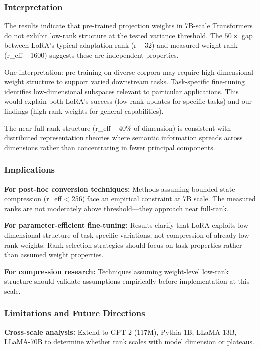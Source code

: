 
\subsubsection{Interpretation}

The results indicate that pre-trained projection weights in 7B-scale Transformers do not exhibit low-rank structure at the tested variance threshold. The $50\times$ gap between LoRA's typical adaptation rank (r ~ 32) and measured weight rank (r\_eff ~ 1600) suggests these are independent properties.

One interpretation: pre-training on diverse corpora may require high-dimensional weight structure to support varied downstream tasks. Task-specific fine-tuning identifies low-dimensional subspaces relevant to particular applications. This would explain both LoRA's success (low-rank updates for specific tasks) and our findings (high-rank weights for general capabilities).

The near full-rank structure (r\_eff ~ 40\% of dimension) is consistent with distributed representation theories where semantic information spreads across dimensions rather than concentrating in fewer principal components.

\subsubsection{Implications}

\textbf{For post-hoc conversion techniques:} Methods assuming bounded-state compression (r\_eff < 256) face an empirical constraint at 7B scale. The measured ranks are not moderately above threshold---they approach near full-rank.

\textbf{For parameter-efficient fine-tuning:} Results clarify that LoRA exploits low-dimensional structure of task-specific variations, not compression of already-low-rank weights. Rank selection strategies should focus on task properties rather than assumed weight properties.

\textbf{For compression research:} Techniques assuming weight-level low-rank structure should validate assumptions empirically before implementation at this scale.

\subsubsection{Limitations and Future Directions}

\textbf{Cross-scale analysis:} Extend to GPT-2 (117M), Pythia-1B, LLaMA-13B, LLaMA-70B to determine whether rank scales with model dimension or plateaus.

